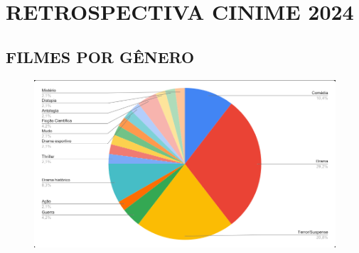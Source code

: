 {\centering 

\section*{RETROSPECTIVA CINIME 2024}
\subsection*{\color{black} FILMES POR GÊNERO}

\begin{figure}[H]
    \centering
    \includegraphics[width=0.95\linewidth]{textos//img/grafico_cinime.png}
\end{figure}
}

\vspace{0.8cm}

